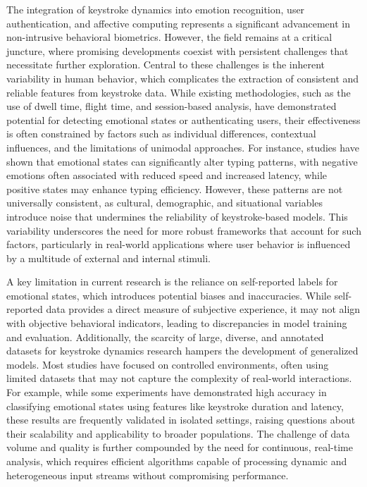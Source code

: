 \documentclass[conference]{IEEEtran}
\begin{document}
The integration of keystroke dynamics into emotion recognition, user authentication, and affective computing represents a significant advancement in non-intrusive behavioral biometrics. However, the field remains at a critical juncture, where promising developments coexist with persistent challenges that necessitate further exploration. Central to these challenges is the inherent variability in human behavior, which complicates the extraction of consistent and reliable features from keystroke data. While existing methodologies, such as the use of dwell time, flight time, and session-based analysis, have demonstrated potential for detecting emotional states or authenticating users, their effectiveness is often constrained by factors such as individual differences, contextual influences, and the limitations of unimodal approaches. For instance, studies have shown that emotional states can significantly alter typing patterns, with negative emotions often associated with reduced speed and increased latency, while positive states may enhance typing efficiency. However, these patterns are not universally consistent, as cultural, demographic, and situational variables introduce noise that undermines the reliability of keystroke-based models. This variability underscores the need for more robust frameworks that account for such factors, particularly in real-world applications where user behavior is influenced by a multitude of external and internal stimuli.

A key limitation in current research is the reliance on self-reported labels for emotional states, which introduces potential biases and inaccuracies. While self-reported data provides a direct measure of subjective experience, it may not align with objective behavioral indicators, leading to discrepancies in model training and evaluation. Additionally, the scarcity of large, diverse, and annotated datasets for keystroke dynamics research hampers the development of generalized models. Most studies have focused on controlled environments, often using limited datasets that may not capture the complexity of real-world interactions. For example, while some experiments have demonstrated high accuracy in classifying emotional states using features like keystroke duration and latency, these results are frequently validated in isolated settings, raising questions about their scalability and applicability to broader populations. The challenge of data volume and quality is further compounded by the need for continuous, real-time analysis, which requires efficient algorithms capable of processing dynamic and heterogeneous input streams without compromising performance.
\end{document}
